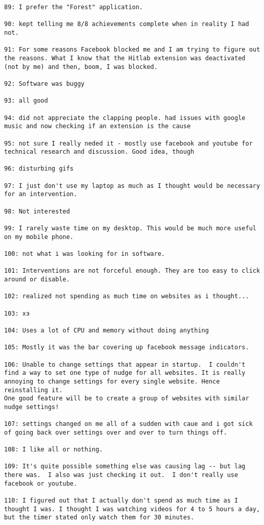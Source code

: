\begin{lstlisting}[breaklines]
89: I prefer the "Forest" application.

90: kept telling me 8/8 achievements complete when in reality I had not.

91: For some reasons Facebook blocked me and I am trying to figure out the reasons. What I know that the Hitlab extension was deactivated (not by me) and then, boom, I was blocked.

92: Software was buggy

93: all good

94: did not appreciate the clapping people. had issues with google music and now checking if an extension is the cause

95: not sure I really neded it - mostly use facebook and youtube for technical research and discussion. Good idea, though

96: disturbing gifs

97: I just don't use my laptop as much as I thought would be necessary for an intervention.

98: Not interested

99: I rarely waste time on my desktop. This would be much more useful on my mobile phone.

100: not what i was looking for in software.

101: Interventions are not forceful enough. They are too easy to click around or disable.

102: realized not spending as much time on websites as i thought...

103: хэ

104: Uses a lot of CPU and memory without doing anything

105: Mostly it was the bar covering up facebook message indicators.

106: Unable to change settings that appear in startup.  I couldn't find a way to set one type of nudge for all websites. It is really annoying to change settings for every single website. Hence reinstalling it.
One good feature will be to create a group of websites with similar nudge settings!

107: settings changed on me all of a sudden with caue and i got sick of going back over settings over and over to turn things off.

108: I like all or nothing.

109: It's quite possible something else was causing lag -- but lag there was.  I also was just checking it out.  I don't really use facebook or youtube.

110: I figured out that I actually don't spend as much time as I thought I was. I thought I was watching videos for 4 to 5 hours a day, but the timer stated only watch them for 30 minutes.


\end{lstlisting}
